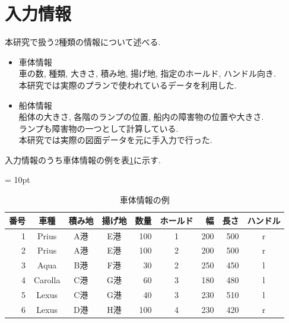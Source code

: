 \section{入力情報}
本研究で扱う2種類の情報について述べる.

\begin{itemize}
    \item 車体情報 \\
    車の数, 種類, 大きさ, 積み地, 揚げ地, 指定のホールド, ハンドル向き. \\
    本研究では実際のプランで使われているデータを利用した.
    \item 船体情報 \\
    船体の大きさ, 各階のランプの位置, 船内の障害物の位置や大きさ. \\
    ランプも障害物の一つとして計算している. \\
    本研究では実際の図面データを元に手入力で行った. \\ 

\end{itemize}
入力情報のうち車体情報の例を表\ref{table21}に示す.

\begin{table}[htbp]
    \tabcolsep = 10pt
    \renewcommand{\arraystretch}{0.7}
    \caption{車体情報の例}
    \label{table21}
    \begin{center}
    \begin{tabular}{rcccrcrrc} 
        \hline
    番号 & 車種 & 積み地 & 揚げ地 & 数量 & ホールド & 幅 & 長さ & ハンドル\\ 
    \hline
    1 & Prius & A港 & E港 & 100 & 1 & 200 & 500 & r \\
    2 & Prius & A港 & E港 & 100 & 2 & 200 & 500 & r \\
    3 & Aqua & B港 & F港 & 30 & 2 & 250 & 450 & l \\
    4 & Carolla & C港 & G港 & 60 & 3 & 180 & 480 & l \\
    5 & Lexus & C港 & G港 & 40 & 3 & 230 & 510 & l \\
    6 & Lexus & D港 & H港 & 100 & 4 & 230 & 420 & r \\
    \hline
    \end{tabular}
    \end{center}
    \end{table}



